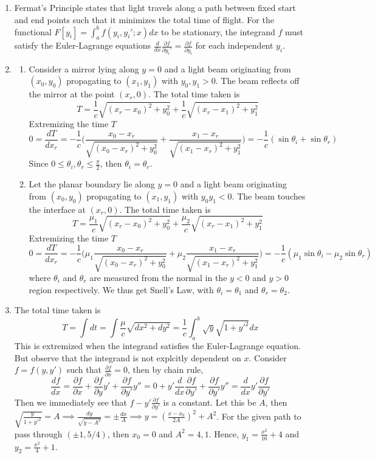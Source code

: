 \documentclass[a4paper]{article}
\begin{document}
\begin{ans}\leavevmode
\begin{enumerate}[label=(\alph*)]
\item Fermat's Principle states that light travels along a path between fixed start and end points such that it minimizes the total time of flight. For the functional $F[y_i]=\int_a^bf(y_i,y_i';x)dx$ to be stationary, the integrand $f$ must satisfy the Euler-Lagrange equations $\frac{d}{dx}\frac{\partial f}{\partial y_i'}=\frac{\partial f}{\partial y_i}$ for each independent $y_i$.
\item 
\begin{enumerate}[label=(\roman*)]
\item Consider a mirror lying along $y=0$ and a light beam originating from $(x_0,y_0)$ propagating to $(x_1,y_1)$ with $y_0,y_1>0$. The beam reflects off the mirror at the point $(x_r,0)$. The total time taken is
$$T=\frac{1}{c}\sqrt{(x_r-x_0)^2+y_0^2}+\frac{1}{c}\sqrt{(x_r-x_1)^2+y_1^2}$$
Extremizing the time $T$
$$0=\frac{dT}{dx_r}=-\frac{1}{c}\bigg(\frac{x_0-x_r}{\sqrt{(x_0-x_r)^2+y_0^2}}+\frac{x_1-x_r}{\sqrt{(x_1-x_r)^2+y_1^2}}\bigg)=-\frac{1}{c}(\sin\theta_i+\sin\theta_r)$$
Since $0\leq\theta_i,\theta_r\leq\frac{\pi}{2}$, then $\theta_i=\theta_r$.\item Let the planar boundary lie along $y=0$ and a light beam originating from $(x_0,y_0)$ propagating to $(x_1,y_1)$ with $y_0y_1<0$. The beam touches the interface at $(x_r,0)$. The total time taken is
$$T=\frac{\mu_1}{c}\sqrt{(x_r-x_0)^2+y_0^2}+\frac{\mu_2}{c}\sqrt{(x_r-x_1)^2+y_1^2}$$
Extremizing the time $T$
$$0=\frac{dT}{dx_r}=-\frac{1}{c}\bigg(\mu_1\frac{x_0-x_r}{\sqrt{(x_0-x_r)^2+y_0^2}}+\mu_2\frac{x_1-x_r}{\sqrt{(x_1-x_r)^2+y_1^2}}\bigg)=-\frac{1}{c}(\mu_1\sin\theta_i-\mu_2\sin\theta_r)$$
where $\theta_i$ and $\theta_r$ are measured from the normal in the $y<0$ and $y>0$ region respectively. We thus get Snell's Law, with $\theta_i=\theta_1$ and $\theta_r=\theta_2$.
\end{enumerate}
\item The total time taken is
$$T=\int dt=\int\frac{\mu}{c}\sqrt{dx^2+dy^2}=\frac{1}{c}\int_a^b\sqrt{y}\sqrt{1+y'^2}dx$$
This is extremized when the integrand satisfies the Euler-Lagrange equation. But observe that the integrand is not explcitly dependent on $x$. Consider $f=f(y,y')$ such that $\frac{\partial f}{\partial x}=0$, then by chain rule,
$$\frac{df}{dx}=\frac{\partial f}{\partial x}+\frac{\partial f}{\partial y}y'+\frac{\partial f}{\partial y'}y''=0+y'\frac{d}{dx}\frac{\partial f}{\partial y'}+\frac{\partial f}{\partial y'}y''=\frac{d}{dx}y'\frac{\partial f}{\partial y'}$$
Then we immediately see that $f-y'\frac{\partial f}{\partial y'} $ is a constant. Let this be $A$, then $\sqrt{\frac{y}{1+y'^2}}=A\implies\frac{dy}{\sqrt{y-A^2}}=\pm\frac{dx}{A}\implies y=(\frac{x-x_0}{2A})^2+A^2$. For the given path to pass through $(\pm1,5/4)$, then $x_0=0$ and $A^2=4,1$. Hence, $y_1=\frac{x^2}{16}+4$ and $y_2=\frac{x^2}{4}+1$.
\end{enumerate}
\end{ans}
\end{document}
